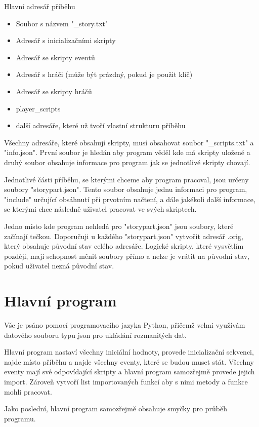 \documentclass[12pt,a4paper]{article}
\begin{document}
Hlavní adresář příběhu
\begin{itemize}
	\item Soubor s názvem "\_story.txt"
	\item Adresář s inicializačními skripty
	\item Adresář se skripty eventů
	\item Adresář s hráči (může být prázdný, pokud je použit klíč)
	\item Adresář se skripty hráčů 
	\item player\_scripts
	\item další adresáře, které už tvoří vlastní strukturu příběhu
\end{itemize}

Všechny adresáře, které obsahují skripty, musí obsahovat soubor "\_scripts.txt" a "info.json". První soubor je hledán aby program věděl kde má skripty uložené a druhý soubor obsahuje informace pro program jak se jednotlivé skripty chovají.

Jednotlivé části příběhu, se kterými chceme aby program pracoval, jsou určeny soubory "storypart.json". Tento soubor obsahuje jednu informaci pro program, "include" určující obsáhnutí při prvotním načtení, a dále jakékoli další informace, se kterými chce následně uživatel pracovat ve svých skriptech.

Jedno místo kde program nehledá pro "storypart.json" jsou soubory, které začínají tečkou. Doporučuji u každého "storypart.json" vytvořit adresář .orig, který obsahuje původní stav celého adresáře. Logické skripty, které vysvětlím později, mají schopnost měnit soubory přímo a nelze je vrátit na původní stav, pokud uživatel nezná původní stav.


\section{Hlavní program}
Vše je psáno pomocí programovacího jazyka Python, přičemž velmi využívám datového souboru typu json pro ukládání rozmanitých dat.

Hlavní program nastaví všechny iniciální hodnoty, provede inicializační sekvenci, najde místo příběhu a najde všechny eventy, které se budou muset stát. Všechny eventy mají své odpovídající skripty a hlavní program samozřejmě provede jejich import. Zároveň vytvoří list importovaných funkcí aby s nimi metody a funkce mohli pracovat.

Jako poslední, hlavní program samozřejmě obsahuje smyčky pro průběh programu.
\end{document}
